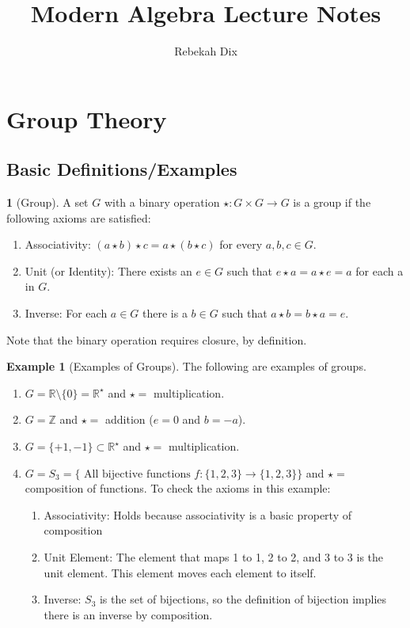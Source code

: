 \documentclass[12pt]{article}
\title{Modern Algebra Lecture Notes}
\author{Rebekah Dix}
\theoremstyle{definition}
\newtheorem{definition}{\color{NavyBlue}{\textbf{Definition}}}
\newtheorem{example}{\color{WildStrawberry}Example}
\theoremstyle{definition}
\begin{document}
\maketitle
\tableofcontents
\newpage 

\section{Group Theory}
\subsection{Basic Definitions/Examples}
\begin{definition}[Group]
A set $G$ with a binary operation $\star: G \times G \rightarrow G$ is a group if the following axioms are satisfied:
\begin{enumerate} 
\item Associativity: $(a \star b) \star c = a \star (b \star c)$ for every $a,b,c \in G$.
\item Unit (or Identity): There exists an $e \in G$ such that $e \star a = a \star e = a$ for each a in $G$.
\item Inverse: For each $a \in G$ there is a $b \in G$ such that $a \star b = b \star a = e$. 
\end{enumerate} 
Note that the binary operation requires closure, by definition.
\end{definition}

\begin{example}[Examples of Groups] 
The following are examples of groups.
\begin{enumerate}
\item $G = \mathbb{R} \setminus \{ 0 \} = \mathbb{R}^{\star}$ and $\star = $ multiplication. 
\item $G = \mathbb{Z}$ and $\star = $ addition ($e=0$ and $b=-a$).
\item $G = \{ +1, -1 \} \subset \mathbb{R}^{\star}$ and $\star = $ multiplication. 
\item $G = S_3 = \{ \text{ All bijective functions } f: \{1,2,3\} \rightarrow \{1,2,3\} \}$ and $\star = $ composition of functions. To check the axioms in this example:
\begin{enumerate}
\item Associativity: Holds because associativity is a basic property of composition
\item Unit Element: The element that maps 1 to 1, 2 to 2, and 3 to 3 is the unit element. This element moves each element to itself. 
\item Inverse: $S_3$ is the set of bijections, so the definition of bijection implies there is an inverse by composition.
\end{enumerate}
\end{enumerate}
\end{example}
\end{document}
